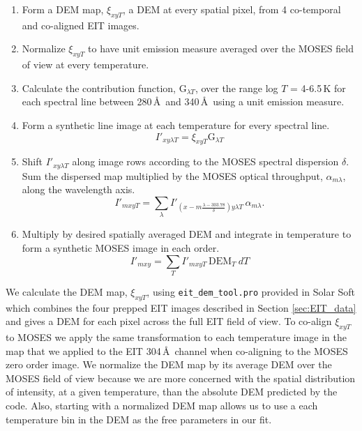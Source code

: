 			\begin{enumerate}
				\item Form a DEM map, $\xi_{xyT}$, a DEM at every spatial pixel, from 4 co-temporal and co-aligned EIT images.
				
				\item Normalize $\xi_{xyT}$ to have unit emission measure averaged over the MOSES field of view at every temperature.
				
				\item Calculate the contribution function, G$_{\lambda T}$, over the range log $T$ = 4-6.5\,K for each spectral line between 280\,\AA \ and 340\,\AA\ using a unit emission measure.
				
				\item Form a synthetic line image at each temperature for every spectral line.
				    \begin{equation}
				        I'_{xy\lambda T} = \xi_{xyT}\text{G}_{\lambda T}
				    \end{equation}

				
				\item Shift $I'_{xy\lambda T}$ along image rows according to the MOSES spectral dispersion $\delta$. 
				Sum the dispersed map multiplied by the  MOSES optical throughput, $\alpha_{m\lambda}$, along the wavelength axis.
					\begin{equation}
						I'_{mxyT} = \sum_{\lambda}I'_{(x-m\frac{\lambda - 303.78}{\delta})y\lambda T}\, \alpha_{m\lambda}.
					\end{equation}
				
				\item Multiply by desired spatially averaged DEM and integrate in temperature to form a synthetic MOSES image in each order. 
					\begin{equation}
						I'_{mxy} = \sum_{T} I'_{mxyT}\, \text{DEM}_T\ dT
					\end{equation}
			\end{enumerate} 
		
	
		We calculate the DEM map, $\xi_{xyT}$, using \texttt{eit\_dem\_tool.pro} provided in Solar Soft which combines the four prepped EIT images described in Section \ref{sec:EIT_data} and gives a DEM for each pixel across the full EIT field of view.
		To co-align $\xi_{xyT}$ to MOSES we apply the same transformation to each temperature image in the map that we applied to the EIT 304\,\AA\ channel when co-aligning to the MOSES zero order image.
		We normalize the DEM map by its average DEM over the MOSES field of view because we are more concerned with the spatial distribution of intensity, at a given temperature, than the absolute DEM predicted by the code.
		Also, starting with a normalized DEM map allows us to use a each temperature bin in the DEM as the free parameters in our fit.

